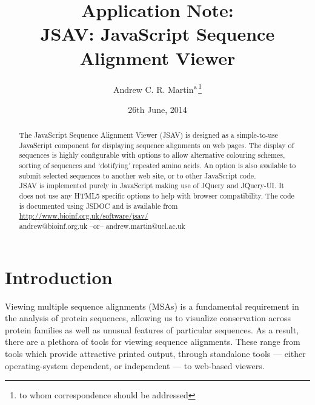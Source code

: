 \documentclass[a4]{bioinfo}
\title[JSAV: JavaScript Sequence Alignment Viewer]{Application Note:\\
JSAV: JavaScript Sequence Alignment Viewer}
\date{26th June, 2014}
\author[Martin]{Andrew C. R. Martin\mbox{${}^{\rm a}$}\footnote{to whom
    correspondence should be addressed}}
\begin{document}
\maketitle

\begin{abstract}
 The JavaScript Sequence Alignment Viewer
(JSAV) is designed as a simple-to-use JavaScript component for
displaying sequence alignments on web pages.  The display of sequences
is highly configurable with options to allow alternative colouring
schemes, sorting of sequences and `dotifying' repeated amino acids. An
option is also available to submit selected sequences to another web
site, or to other JavaScript code.  \\
JSAV is implemented purely in JavaScript making use of JQuery and
JQuery-UI. It does not use any HTML5 specific options to help with
browser compatibility. The code is documented using JSDOC
and is available from \url{http://www.bioinf.org.uk/software/jsav/}\\
 andrew@bioinf.org.uk --or--
andrew.martin@ucl.ac.uk
\end{abstract}


\section{Introduction}
Viewing multiple sequence alignments (MSAs) is a fundamental
requirement in the analysis of protein sequences, allowing us to
visualize conservation across protein families as well as unusual
features of particular sequences. As a result, there are a plethora of
tools for viewing sequence alignments. These range from tools which
provide attractive printed output, through standalone tools --- either
operating-system dependent, or independent --- to web-based viewers.
\end{document}
